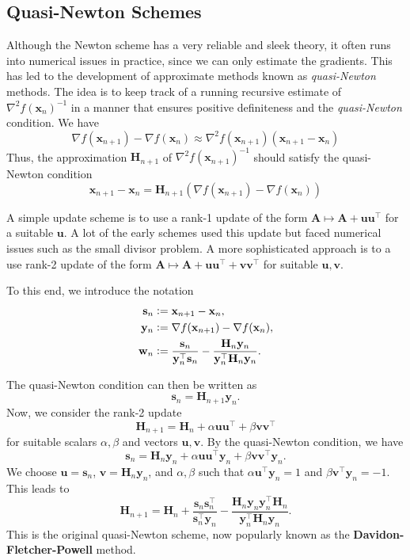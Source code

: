 \subsection*{Quasi-Newton Schemes}

Although the Newton scheme has a very reliable and sleek theory, it often runs into numerical issues in practice, since we can only estimate the gradients. This has led to the development of approximate methods known as \emph{quasi-Newton} methods. The idea is to keep track of a running recursive estimate of $\nabla^2 f(\mathbf{x}_n)^{-1}$ in a manner that ensures positive definiteness and the \emph{quasi-Newton} condition. We have
\[
    \nabla f(\mathbf{x}_{n+1}) - \nabla f(\mathbf{x}_n) \approx \nabla^2 f(\mathbf{x}_{n+1}) (\mathbf{x}_{n+1} - \mathbf{x}_n)
\]
Thus, the approximation $\mathbf{H}_{n+1}$ of $\nabla^2 f(\mathbf{x}_{n+1})^{-1}$ should satisfy the quasi-Newton condition
\[
    \mathbf{x}_{n+1} - \mathbf{x}_n = \mathbf{H}_{n+1} \left( \nabla f(\mathbf{x}_{n+1}) - \nabla f(\mathbf{x}_n) \right)
\]

A simple update scheme is to use a rank-1 update of the form $\mathbf{A} \mapsto \mathbf{A} + \mathbf{uu}^{\top}$ for a suitable $\mathbf{u}$. A lot of the early schemes used this update but faced numerical issues such as the small divisor problem. A more sophisticated approach is to a use rank-2 update of the form $\mathbf{A} \mapsto \mathbf{A} + \mathbf{uu}^{\top} + \mathbf{vv}^{\top}$ for suitable $\mathbf{u}, \mathbf{v}$. 

To this end, we introduce the notation 
\begin{align*}
    \mathbf{s}_n &\vcentcolon= \mathbf{x}_{n+1} - \mathbf{x}_n, \\
    \mathbf{y}_n &\vcentcolon= \nabla f(\mathbf{x}_{n+1}) - \nabla f(\mathbf{x}_n), \\
    \mathbf{w}_n &\vcentcolon= \frac{\mathbf{s}_n}{\mathbf{y}_n^{\top} \mathbf{s}_n} - \frac{\mathbf{H}_n \mathbf{y}_n}{\mathbf{y}_n^{\top} \mathbf{H}_n \mathbf{y}_n}.
\end{align*}

The quasi-Newton condition can then be written as
\[
    \mathbf{s}_n = \mathbf{H}_{n+1} \mathbf{y}_n.
\]
Now, we consider the rank-2 update
\[
    \mathbf{H}_{n+1} = \mathbf{H}_n + \alpha \mathbf{uu}^{\top} + \beta \mathbf{vv}^{\top}
\]
for suitable scalars $\alpha,\beta$ and vectors $\mathbf{u},\mathbf{v}$. By the quasi-Newton condition, we have
\[
    \mathbf{s}_n = \mathbf{H}_n\mathbf{y}_n + \alpha \mathbf{uu}^{\top} \mathbf{y}_n + \beta \mathbf{vv}^{\top} \mathbf{y}_n.
\]
We choose $\mathbf{u} = \mathbf{s}_n$, $\mathbf{v} = \mathbf{H}_n \mathbf{y}_n$, and $\alpha, \beta$ such that $\alpha \mathbf{u}^{\top} \mathbf{y}_n = 1$ and $\beta \mathbf{v}^{\top} \mathbf{y}_n = -1$. This leads to 
\[
    \mathbf{H}_{n+1} = \mathbf{H}_n + \frac{\mathbf{s}_n \mathbf{s}_n^{\top}}{\mathbf{s}_n^{\top} \mathbf{y}_n} - \frac{\mathbf{H}_n \mathbf{y}_n \mathbf{y}_n^{\top} \mathbf{H}_n}{\mathbf{y}_n^{\top} \mathbf{H}_n \mathbf{y}_n}.
\]
This is the original quasi-Newton scheme, now popularly known as the \textbf{Davidon-Fletcher-Powell} method. 

